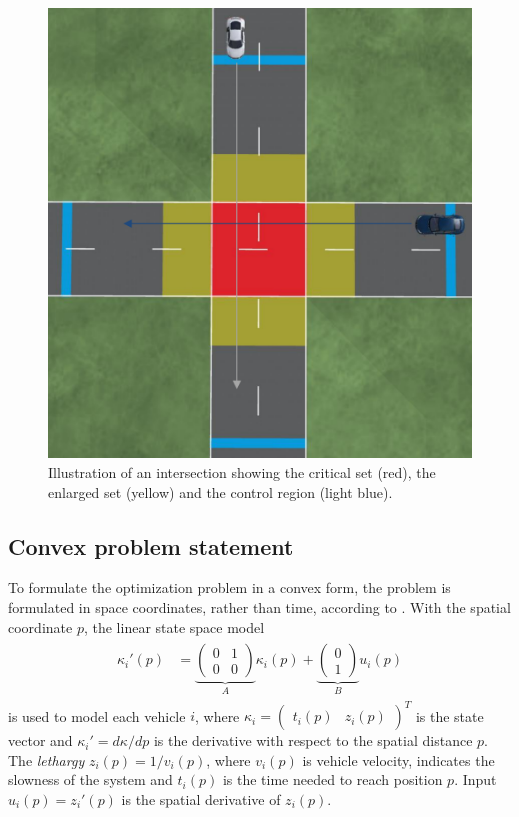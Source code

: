 \documentclass[letterpaper,10pt,conference]{ieeeconf}
\begin{document}
\begin{figure}
    \centering
    \includegraphics[width=0.9\columnwidth]{czone.pdf}
    \caption{Illustration of an intersection showing the critical set (red), the enlarged set (yellow) and the control region (light blue).}
    \label{fig:ProbState}
\end{figure}

\subsection{Convex problem statement}
To formulate the optimization problem in a convex form, the problem is formulated in space coordinates, rather than time, according to \cite{nikolce}. With the spatial coordinate $p$, the linear state space model
\begin{align}\label{statesp}
\begin{split}
\kappa_i'(p)&=\underbrace{\begin{pmatrix}
0& 1\\
0& 0
\end{pmatrix}}_{{A}}\kappa_i(p) + \underbrace{\begin{pmatrix}
0\\
1\end{pmatrix}}_Bu_i(p)
\end{split}
\end{align}
is used to model each vehicle $i$, where $\kappa_i=\begin{pmatrix}t_i(p)& z_i(p)\end{pmatrix}^T$ is the state vector and $\kappa_i'=d\kappa/dp$ is the derivative with respect to the spatial distance $p$. The \emph{lethargy} \mbox{$z_i(p)=1/v_i(p)$}, where $v_i(p)$ is vehicle velocity, indicates the slowness of the system and $t_i(p)$ is the time needed to reach position $p$. Input $u_i(p)=z_i'(p)$ is the spatial derivative of $z_i(p)$.
\end{document}
